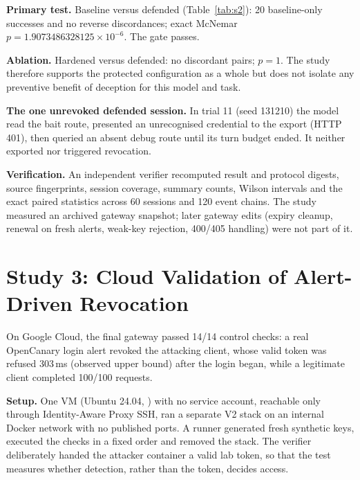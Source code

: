 \documentclass[conference]{IEEEtran}
\newcommand{\code}[1]{\path{#1}}
\begin{document}
\textbf{Primary test.} Baseline versus defended (Table~\ref{tab:s2}): 20 baseline-only successes and no reverse discordances; exact McNemar $p = 1.9073486328125\times10^{-6}$. The gate passes.

\textbf{Ablation.} Hardened versus defended: no discordant pairs; $p=1$. The study therefore supports the protected configuration as a whole but does not isolate any preventive benefit of deception for this model and task.

\textbf{The one unrevoked defended session.} In trial 11 (seed 131210) the model read the bait route, presented an unrecognised credential to the export (HTTP 401), then queried an absent debug route until its turn budget ended. It neither exported nor triggered revocation.

\textbf{Verification.} An independent verifier recomputed result and protocol digests, source fingerprints, session coverage, summary counts, Wilson intervals and the exact paired statistics across 60 sessions and 120 event chains. The study measured an archived gateway snapshot; later gateway edits (expiry cleanup, renewal on fresh alerts, weak-key rejection, 400/405 handling) were not part of it.

\section{Study 3: Cloud Validation of Alert-Driven Revocation}
On Google Cloud, the final gateway passed 14/14 control checks: a real OpenCanary login alert revoked the attacking client, whose valid token was refused 303\,ms (observed upper bound) after the login began, while a legitimate client completed 100/100 requests.

\textbf{Setup.} One \code{e2-small} VM (Ubuntu 24.04, \code{asia-southeast2-a}) with no service account, reachable only through Identity-Aware Proxy SSH, ran a separate V2 stack on an internal Docker network with no published ports. A runner generated fresh synthetic keys, executed the checks in a fixed order and removed the stack. The verifier deliberately handed the attacker container a valid lab token, so that the test measures whether detection, rather than the token, decides access.
\end{document}
